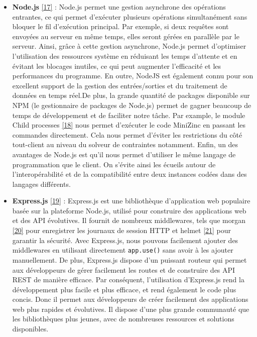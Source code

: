 \documentclass[
  12pt,
]{article}
\begin{document}
\begin{itemize}
  \item
        \textbf{Node.js} \protect\hyperlink{ref-Node_js}{{[}17{]}} : Node.js
        permet une gestion asynchrone des opérations entrantes, ce qui permet
        d'exécuter plusieurs opérations simultanément sans bloquer le fil
        d'exécution principal. Par exemple, si deux requêtes sont envoyées au
        serveur en même temps, elles seront gérées en parallèle par le
        serveur. Ainsi, grâce à cette gestion asynchrone, Node.js permet
        d'optimiser l'utilisation des ressources système en réduisant les
        temps d'attente et en évitant les blocages inutiles, ce qui peut
        augmenter l'efficacité et les performances du programme. En outre,
        NodeJS est également connu pour son excellent support de la gestion
        des entrées/sorties et du traitement de données en temps
        réel.\newline  De plus, la grande quantité de packages disponible sur
        NPM (le gestionnaire de packages de Node.js) permet de gagner beaucoup
        de temps de développement et de faciliter notre tâche. Par example, le
        module Child processes
        \protect\hyperlink{ref-Child_Processes}{{[}18{]}} nous permet
        d'exécuter le code MiniZinc en passant les commandes directement. Cela
        nous permet d'éviter les restrictions du côté tout-client au niveau du
        solveur de contraintes notamment. Enfin, un des avantages de Node.js
        est qu'il nous permet d'utiliser le même langage de programmation que
        le client. On s'évite ainsi les écueils autour de l'interopérabilité
        et de la compatibilité entre deux instances codées dans des langages
        différents.
  \item
        \textbf{Express.js} \protect\hyperlink{ref-Express_js}{{[}19{]}} :
        Express.js est une bibliothèque d'application web populaire basée sur
        la plateforme Node.js, utilisé pour construire des applications web et
        des API évolutives. Il fournit de nombreux middlewares, tels que
        morgan \protect\hyperlink{ref-morgan}{{[}20{]}} pour enregistrer les
        journaux de session HTTP et helmet
        \protect\hyperlink{ref-helmet}{{[}21{]}} pour garantir la sécurité.
        Avec Express.js, nous pouvons facilement ajouter des middlewares en
        utilisant directement \texttt{app.use()} sans avoir à les ajouter
        manuellement. De plus, Express.js dispose d'un puissant routeur qui
        permet aux développeurs de gérer facilement les routes et de
        construire des API REST de manière efficace. Par conséquent,
        l'utilisation d'Express.js rend la développement plus facile et plus
        efficace, et rend également le code plus concis. Donc il permet aux
        développeurs de créer facilement des applications web plus rapides et
        évolutives. Il dispose d'une plus grande communauté que les
        bibliothèques plus jeunes, avec de nombreuses ressources et solutions
        disponibles.
\end{itemize}
\end{document}
